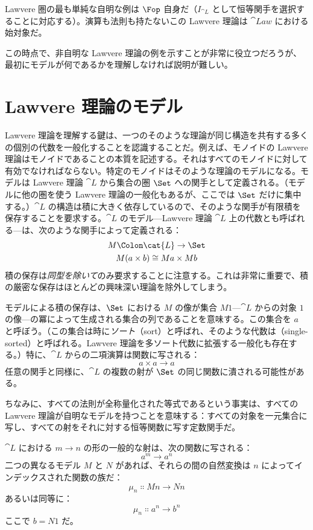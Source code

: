 Lawvere 圏の最も単純な自明な例は $\Fop$ 自身だ（$I_{\cat{L}}$ として恒等関手を選択することに対応する）。演算も法則も持たないこの Lawvere 理論は $\cat{Law}$ における始対象だ。

この時点で、非自明な Lawvere 理論の例を示すことが非常に役立つだろうが、最初にモデルが何であるかを理解しなければ説明が難しい。

\section{Lawvere 理論のモデル}

Lawvere 理論を理解する鍵は、一つのそのような理論が同じ構造を共有する多くの個別の代数を一般化することを認識することだ。例えば、モノイドの Lawvere 理論はモノイドであることの本質を記述する。それはすべてのモノイドに対して有効でなければならない。特定のモノイドはそのような理論のモデルになる。モデルは Lawvere 理論 $\cat{L}$ から集合の圏 $\Set$ への関手として定義される。（モデルに他の圏を使う Lawvere 理論の一般化もあるが、ここでは $\Set$ だけに集中する。）$\cat{L}$ の構造は積に大きく依存しているので、そのような関手が有限積を保存することを要求する。$\cat{L}$ のモデル—Lawvere 理論 $\cat{L}$ 上の代数とも呼ばれる—は、次のような関手によって定義される：
\begin{gather*}
  M \Colon \cat{L} \to \Set \\
  M (a \times b) \cong M a \times M b
\end{gather*}
積の保存は\emph{同型を除いて}のみ要求することに注意する。これは非常に重要で、積の厳密な保存はほとんどの興味深い理論を除外してしまう。

モデルによる積の保存は、$\Set$ における $M$ の像が集合 $M 1$—$\cat{L}$ からの対象 $1$ の像—の冪によって生成される集合の列であることを意味する。この集合を $a$ と呼ぼう。（この集合は時に\emph{ソート}（sort）と呼ばれ、そのような代数は（single-sorted）と呼ばれる。Lawvere 理論を多ソート代数に拡張する一般化も存在する。）特に、$\cat{L}$ からの二項演算は関数に写される：
\[a \times a \to a\]
任意の関手と同様に、$\cat{L}$ の複数の射が $\Set$ の同じ関数に潰される可能性がある。

ちなみに、すべての法則が全称量化された等式であるという事実は、すべての Lawvere 理論が自明なモデルを持つことを意味する：すべての対象を一元集合に写し、すべての射をそれに対する恒等関数に写す定数関手だ。

$\cat{L}$ における $m \to n$ の形の一般的な射は、次の関数に写される：
\[a^m \to a^n\]
二つの異なるモデル $M$ と $N$ があれば、それらの間の自然変換は $n$ によってインデックスされた関数の族だ：
\[\mu_n \Colon M n \to N n\]
あるいは同等に：
\[\mu_n \Colon a^n \to b^n\]
ここで $b = N 1$ だ。

